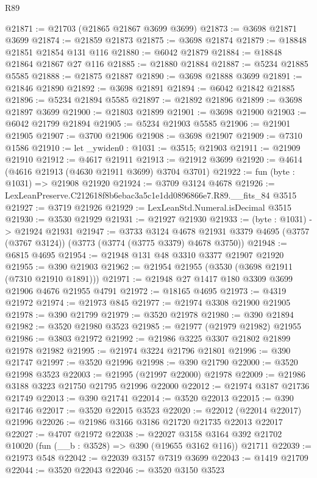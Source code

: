\begin{lexlean}{R89}
\begin{coremodule}
@21871 := @21703 (@21865 @21867 @3699 @3699)
@21873 := @3698 @21871 @3699
@21874 := @21859 @21873
@21875 := @3698 @21874
@21879 := @18848 @21851 @21854 @131 @116
@21880 := @6042 @21879
@21884 := @18848 @21864 @21867 @27 @116
@21885 := @21880 @21884
@21887 := @5234 @21885 @5585
@21888 := @21875 @21887
@21890 := @3698 @21888 @3699
@21891 := @21846 @21890
@21892 := @3698 @21891
@21894 := @6042 @21842 @21885
@21896 := @5234 @21894 @5585
@21897 := @21892 @21896
@21899 := @3698 @21897 @3699
@21900 := @21803 @21899
@21901 := @3698 @21900
@21903 := @6042 @21799 @21894
@21905 := @5234 @21903 @5585
@21906 := @21901 @21905
@21907 := @3700 @21906
@21908 := @3698 @21907
@21909 := @7310 @1586
@21910 := let _ywiden0 : @1031 := @3515; @21903
@21911 := @21909 @21910
@21912 := @4617 @21911
@21913 := @21912 @3699
@21920 := @4614 (@4616 @21913 (@4630 @21911 @3699) @3704 @3701)
@21922 := fun (byte : @1031) => @21908 @21920
@21924 := @3709 @3124 @4678
@21926 := LexLeanPreserve.C212618f8b6ebac3a5c1e1dd0896866e7.R89.__fits_84 @3515
@21927 := @3719 @21926
@21929 := LexLeanStd.Numeral.isDecimal @3515
@21930 := @3530 @21929
@21931 := @21927 @21930
@21933 := (byte : @1031) -> @21924 @21931
@21947 := @3733
    @3124
    @4678
    @21931
    @3379
    @4695
    (@3757 (@3767 @3124))
    (@3773 (@3774 (@3775 @3379) @4678 @3750))
@21948 := @6815 @4695
@21954 := @21948 @131 @48 @3310 @3377 @21907 @21920
@21955 := @390 @21903
@21962 := @21954 @21955 (@3530 (@3698 @21911 (@7310 @21910 @1891)))
@21971 := @21948 @27 @1417 @180 @3309 @3699 @21906 @4676 @21955 @4791
@21972 := @18165 @4695
@21973 := @4319 @21972
@21974 := @21973 @845
@21977 := @21974 @3308 @21900 @21905
@21978 := @390 @21799
@21979 := @3520 @21978
@21980 := @390 @21894
@21982 := @3520 @21980 @3523
@21985 := @21977 (@21979 @21982) @21955
@21986 := @3803 @21972
@21992 := @21986 @3225 @3307 @21802 @21899 @21978 @21982
@21995 := @21974 @3224 @21796 @21801
@21996 := @390 @21747
@21997 := @3520 @21996
@21998 := @390 @21790
@22000 := @3520 @21998 @3523
@22003 := @21995 (@21997 @22000) @21978
@22009 := @21986 @3188 @3223 @21750 @21795 @21996 @22000
@22012 := @21974 @3187 @21736 @21749
@22013 := @390 @21741
@22014 := @3520 @22013
@22015 := @390 @21746
@22017 := @3520 @22015 @3523
@22020 := @22012 (@22014 @22017) @21996
@22026 := @21986 @3166 @3186 @21720 @21735 @22013 @22017
@22027 := @4707 @21972
@22038 := @22027
    @3158
    @3164
    @392
    @21702
    @10020
    (fun (__b : @3528) => @390 (@19655 @3162 @116))
    @21711
@22039 := @21973 @548
@22042 := @22039 @3157 @7319 @3699
@22043 := @1419 @21709
@22044 := @3520 @22043
@22046 := @3520 @3150 @3523

\end{coremodule}
\end{lexlean}
